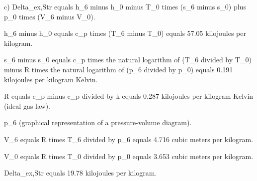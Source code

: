 c)
Delta_ex,Str equals h_6 minus h_0 minus T_0 times (s_6 minus s_0) plus p_0 times (V_6 minus V_0).

h_6 minus h_0 equals c_p times (T_6 minus T_0) equals 57.05 kilojoules per kilogram.

s_6 minus s_0 equals c_p times the natural logarithm of (T_6 divided by T_0) minus R times the natural logarithm of (p_6 divided by p_0) equals 0.191 kilojoules per kilogram Kelvin.

R equals c_p minus c_p divided by k equals 0.287 kilojoules per kilogram Kelvin (ideal gas law).

p_6 (graphical representation of a pressure-volume diagram).

V_6 equals R times T_6 divided by p_6 equals 4.716 cubic meters per kilogram.

V_0 equals R times T_0 divided by p_0 equals 3.653 cubic meters per kilogram.

Delta_ex,Str equals 19.78 kilojoules per kilogram.